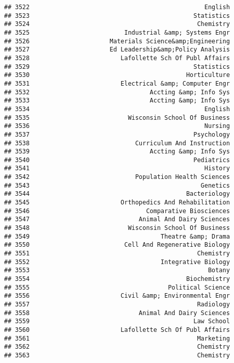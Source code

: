 \documentclass[
]{article}
\begin{document}
\begin{verbatim}
## 3522                                                English
## 3523                                             Statistics
## 3524                                              Chemistry
## 3525                          Industrial &amp; Systems Engr
## 3526                      Materials Science&amp;Engineering
## 3527                      Ed Leadership&amp;Policy Analysis
## 3528                         Lafollette Sch Of Publ Affairs
## 3529                                             Statistics
## 3530                                           Horticulture
## 3531                         Electrical &amp; Computer Engr
## 3532                                 Accting &amp; Info Sys
## 3533                                 Accting &amp; Info Sys
## 3534                                                English
## 3535                           Wisconsin School Of Business
## 3536                                                Nursing
## 3537                                             Psychology
## 3538                             Curriculum And Instruction
## 3539                                 Accting &amp; Info Sys
## 3540                                             Pediatrics
## 3541                                                History
## 3542                             Population Health Sciences
## 3543                                               Genetics
## 3544                                           Bacteriology
## 3545                         Orthopedics And Rehabilitation
## 3546                                Comparative Biosciences
## 3547                              Animal And Dairy Sciences
## 3548                           Wisconsin School Of Business
## 3549                                    Theatre &amp; Drama
## 3550                          Cell And Regenerative Biology
## 3551                                              Chemistry
## 3552                                    Integrative Biology
## 3553                                                 Botany
## 3554                                           Biochemistry
## 3555                                      Political Science
## 3556                         Civil &amp; Environmental Engr
## 3557                                              Radiology
## 3558                              Animal And Dairy Sciences
## 3559                                             Law School
## 3560                         Lafollette Sch Of Publ Affairs
## 3561                                              Marketing
## 3562                                              Chemistry
## 3563                                              Chemistry

\end{verbatim}
\end{document}
